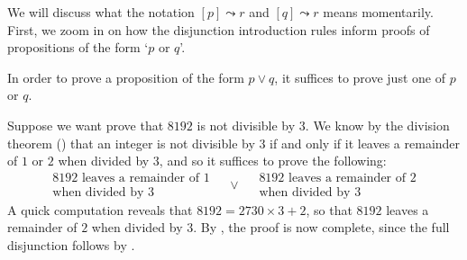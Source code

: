 We will discuss what the notation $[p] \leadsto r$ and $[q] \leadsto r$ means momentarily. First, we zoom in on how the disjunction introduction rules inform proofs of propositions of the form `$p$ or $q$'.

\begin{strategy}
\label{strProvingDisjunctionsDirect}
In order to prove a proposition of the form $p \vee q$, it suffices to prove just one of $p$ or $q$.
\end{strategy}

\begin{example}
Suppose we want prove that $8192$ is not divisible by $3$. We know by the division theorem () that an integer is not divisible by $3$ if and only if it leaves a remainder of $1$ or $2$ when divided by $3$, and so it suffices to prove the following:
\[
\begin{matrix} 8192 \text{ leaves a remainder of } 1 \\ \text{when divided by } 3 \end{matrix}
\quad \vee \quad
\begin{matrix} 8192 \text{ leaves a remainder of } 2 \\
\text{when divided by } 3 \end{matrix}
\]
A quick computation reveals that $8192 = 2730 \times 3 + 2$, so that $8192$ leaves a remainder of $2$ when divided by $3$. By , the proof is now complete, since the full disjunction follows by .
\end{example}

